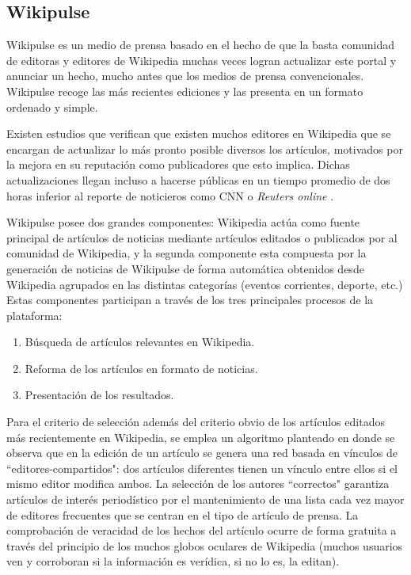 
\subsection{Wikipulse}

Wikipulse es un medio de prensa \cite{Futterer:arXiv1308.1166} basado en el hecho de que la basta comunidad de editoras y editores de Wikipedia muchas veces logran actualizar este portal y anunciar un hecho, mucho antes que los medios de prensa convencionales. Wikipulse recoge las más recientes ediciones y las presenta en un formato ordenado y simple.

Existen estudios \cite{wikipediaEditor:Online} que verifican que existen muchos editores en Wikipedia que se encargan de actualizar lo más pronto posible diversos los artículos, motivados por la mejora en su reputación como publicadores que esto implica. Dichas actualizaciones llegan incluso a hacerse públicas en un tiempo promedio de dos horas inferior al reporte de noticieros como CNN o \emph{Reuters online} \cite{beckerWikipedia}.

Wikipulse posee dos grandes componentes:  Wikipedia actúa como fuente principal de artículos de noticias mediante artículos editados o publicados por al comunidad de Wikipedia, y la segunda componente esta compuesta por la generación de noticias de Wikipulse de forma automática obtenidos desde Wikipedia agrupados en las distintas categorías (eventos corrientes, deporte, etc.) Estas componentes participan a través de los tres principales procesos de la plataforma:

\begin{enumerate}
	\item Búsqueda de artículos relevantes en Wikipedia.
	\item Reforma de los artículos en formato de noticias.
	\item Presentación de los resultados.
\end{enumerate}

Para el criterio de selección además del criterio obvio de los artículos editados más recientemente en Wikipedia, se emplea un algoritmo planteado en \cite{journals/corr/abs-1204-3375} donde se observa que en la edición de un artículo se genera una red basada en vínculos de ``editores-compartidos": dos artículos diferentes tienen un vínculo entre ellos si el mismo editor modifica ambos. La selección de los autores ``correctos" garantiza artículos de interés periodístico por el mantenimiento de una lista cada vez mayor de editores frecuentes que se centran en el tipo de artículo de prensa. La comprobación de veracidad de los hechos del artículo ocurre de forma gratuita a través del principio de los muchos globos oculares de Wikipedia (muchos usuarios ven y corroboran si la información es verídica, si no lo es, la editan).

